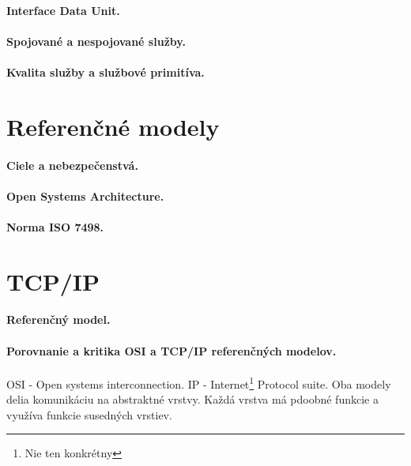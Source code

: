 \paragraph{Interface Data Unit.}             
\paragraph{Spojované a nespojované služby.}  
\paragraph{Kvalita služby a službové primitíva.}            
\section{Referenčné modely}           
\paragraph{Ciele a nebezpečenstvá.}   
\paragraph{Open Systems Architecture.} 
\paragraph{Norma ISO 7498.}                      
\section{TCP/IP}    
\label{OSI}              
\paragraph{Referenčný model.}     
\paragraph{Porovnanie a kritika OSI a TCP/IP referenčných modelov.}    
OSI - Open systems interconnection. IP - Internet\footnote{Nie ten konkrétny} Protocol suite. Oba modely delia komunikáciu na abstraktné vrstvy. 
Každá vrstva má pdoobné funkcie a využíva funkcie susedných vrstiev. 


